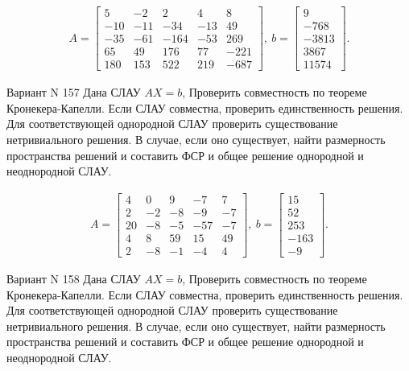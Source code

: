 \documentclass[11pt]{report}
\begin{document}
\begin{align*}
 A = \left[\begin{matrix}5 & -2 & 2 & 4 & 8\\-10 & -11 & -34 & -13 & 49\\-35 & -61 & -164 & -53 & 269\\65 & 49 & 176 & 77 & -221\\180 & 153 & 522 & 219 & -687\end{matrix}\right],
\ b = \left[\begin{matrix}9\\-768\\-3813\\3867\\11574\end{matrix}\right]. 
 \end{align*}

Вариант N 157
Дана СЛАУ $AX = b$,
Проверить совместность по теореме Кронекера-Капелли. Если СЛАУ совместна, проверить единственность решения.
Для соответствующей однородной СЛАУ проверить существование нетривиального решения. В случае, если оно существует,
найти размерность пространства решений и составить ФСР и общее решение однородной  и неоднородной СЛАУ.


\begin{align*}
 A = \left[\begin{matrix}4 & 0 & 9 & -7 & 7\\2 & -2 & -8 & -9 & -7\\20 & -8 & -5 & -57 & -7\\4 & 8 & 59 & 15 & 49\\2 & -8 & -1 & -4 & 4\end{matrix}\right],
\ b = \left[\begin{matrix}15\\52\\253\\-163\\-9\end{matrix}\right]. 
 \end{align*}

Вариант N 158
Дана СЛАУ $AX = b$,
Проверить совместность по теореме Кронекера-Капелли. Если СЛАУ совместна, проверить единственность решения.
Для соответствующей однородной СЛАУ проверить существование нетривиального решения. В случае, если оно существует,
найти размерность пространства решений и составить ФСР и общее решение однородной  и неоднородной СЛАУ.
\end{document}
